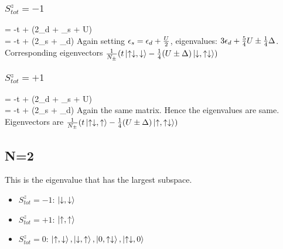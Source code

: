 \documentclass[12pt]{article}
\begin{document}
\subsubsection{\(S_{tot}^z = -1\)}
\beq
\ham \ket{\uparrow\downarrow,\downarrow} = -t\ket{\downarrow,\uparrow\downarrow} + (2\epsilon_d + \epsilon_s + U)\ket{\uparrow\downarrow,\downarrow} \\
\ham \ket{\downarrow,\uparrow\downarrow} = -t\ket{\uparrow\downarrow,\downarrow} + (2\epsilon_s + \epsilon_d)\ket{\downarrow,\uparrow\downarrow}
\eeq
\beq
{}
\eeq
Again setting \(\epsilon_s = \epsilon_d + \frac{U}{2}\), eigenvalues: \(3\epsilon_d + \frac{5}{4}U \pm \frac{1}{4}\Delta\). \\ Corresponding eigenvectors \(\frac{1}{N_\pm}(t\ket{\uparrow\downarrow,\downarrow}-\frac{1}{4}(U\pm\Delta)\ket{\downarrow,\uparrow\downarrow})\)

\subsubsection{\(S_{tot}^z = +1\)}
\beq
\ham \ket{\uparrow\downarrow,\uparrow} = -t\ket{\uparrow,\uparrow\downarrow} + (2\epsilon_d + \epsilon_s + U)\ket{\uparrow\downarrow,\uparrow} \\
\ham \ket{\uparrow,\uparrow\downarrow} = -t\ket{\uparrow\downarrow,\uparrow} + (2\epsilon_s + \epsilon_d)\ket{\uparrow,\uparrow\downarrow}
\eeq
Again the same matrix. Hence the eigenvalues are same. Eigenvectors are
\(\frac{1}{N_\pm}(t\ket{\uparrow\downarrow,\uparrow}-\frac{1}{4}(U\pm\Delta)\ket{\uparrow,\uparrow\downarrow})\)

\subsection{N=2}
This is the eigenvalue that has the largest subspace.
\begin{itemize}
\item \(S_{tot}^z = -1\): \(\ket{\downarrow,\downarrow}\)
\item \(S_{tot}^z = +1\): \(\ket{\uparrow,\uparrow}\)
\item \(S_{tot}^z = 0\):  \(\ket{\uparrow,\downarrow},\ket{\downarrow,\uparrow},\ket{0,\uparrow\downarrow},\ket{\uparrow\downarrow,0}\)
\end{itemize}
\end{document}
